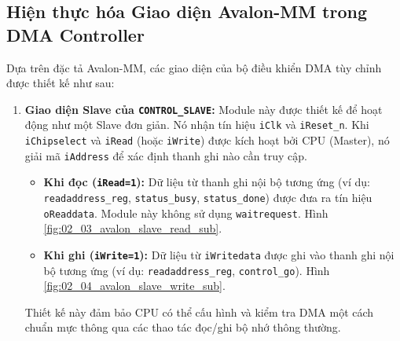 \subsection{Hiện thực hóa Giao diện Avalon-MM trong DMA Controller}
Dựa trên đặc tả Avalon-MM, các giao diện của bộ điều khiển DMA tùy chỉnh được thiết kế như sau:
\begin{enumerate}
    \item \textbf{Giao diện Slave của \texttt{CONTROL\_SLAVE}:} Module này được thiết kế để hoạt động như một Slave đơn giản. Nó nhận tín hiệu \texttt{iClk} và \texttt{iReset\_n}. Khi \texttt{iChipselect} và \texttt{iRead} (hoặc \texttt{iWrite}) được kích hoạt bởi CPU (Master), nó giải mã \texttt{iAddress} để xác định thanh ghi nào cần truy cập.
        \begin{itemize}
            \item \textbf{Khi đọc (\texttt{iRead=1}):} Dữ liệu từ thanh ghi nội bộ tương ứng (ví dụ: \texttt{readaddress\_reg}, \texttt{status\_busy}, \texttt{status\_done}) được đưa ra tín hiệu \texttt{oReaddata}. Module này không sử dụng \texttt{waitrequest}. Hình \ref{fig:02_03_avalon_slave_read_sub}.
            \item \textbf{Khi ghi (\texttt{iWrite=1}):} Dữ liệu từ \texttt{iWritedata} được ghi vào thanh ghi nội bộ tương ứng (ví dụ: \texttt{readaddress\_reg}, \texttt{control\_go}). Hình \ref{fig:02_04_avalon_slave_write_sub}.
        \end{itemize}
        Thiết kế này đảm bảo CPU có thể cấu hình và kiểm tra DMA một cách chuẩn mực thông qua các thao tác đọc/ghi bộ nhớ thông thường.


\end{enumerate}
